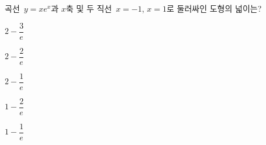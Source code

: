 \hspace*{2mm}\begin{minipage}[t]{\dimexpr\linewidth-2mm\relax}\vspace{0pt}
곡선~$y=xe^x$과 $x$축 및 두 직선~$x=-1$, $x=1$로 둘러싸인 도형의 넓이는?
\begin{choices32}{\rule[-3ex]{0pt}{8ex}$2-\dfrac{3}{e}$}{\rule[-3ex]{0pt}{8ex}$2-\dfrac{2}{e}$}{\rule[-3ex]{0pt}{8ex}$2-\dfrac{1}{e}$}{\rule[-3ex]{0pt}{8ex}$1-\dfrac{2}{e}$}{\rule[-3ex]{0pt}{8ex}$1-\dfrac{1}{e}$}\end{choices32}\end{minipage}
